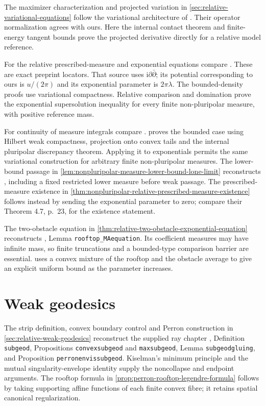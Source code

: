 The maximizer characterization and projected variation in \cref{sec:relative-variational-equations} follow the variational architecture of \cite[Theorem 4.1 and Lemma 4.2, pp.~207--209]{BBGZ13}. Their operator normalization agrees with ours. Here the internal contact theorem and finite-energy tangent bounds prove the projected derivative directly for a relative model reference.

For the relative prescribed-measure and exponential equations compare \cite[Theorem 4.3, p.~20; Theorem 5.3 and Lemma 5.4, pp.~24--25]{DDNL2020equationsv3}. These are exact preprint locators. That source uses $\mathrm{i}\partial\bar\partial$; its potential corresponding to ours is $u/(2\pi)$ and its exponential parameter is $2\pi\lambda$. The bounded-density proofs use variational compactness. Relative comparison and domination prove the exponential supersolution inequality for every finite non-pluripolar measure, with positive reference mass.

For continuity of measure integrals compare \cite[Theorem 3.10, pp.~203--205]{BBGZ13}.  proves the bounded case using Hilbert weak compactness, projection onto convex tails and the internal pluripolar discrepancy theorem. Applying it to exponentials permits the same variational construction for arbitrary finite non-pluripolar measures. The lower-bound passage in \cref{lem:nonpluripolar-measure-lower-bound-lone-limit} reconstructs \cite[Lemma 2.8, pp.~12--13]{DDNL2020equationsv3}, including a fixed restricted lower measure before weak passage. The prescribed-measure existence in \cref{thm:nonpluripolar-relative-prescribed-measure-existence} follows instead by sending the exponential parameter to zero; compare their Theorem 4.7, p.~23, for the existence statement.

The two-obstacle equation in \cref{thm:relative-two-obstacle-exponential-equation} reconstructs \cite{XiaSampleBook}, Lemma \texttt{rooftop\_MAequation}. Its coefficient measures may have infinite mass, so finite truncations and a bounded-type comparison barrier are essential.  uses a convex mixture of the rooftop and the obstacle average to give an explicit uniform bound as the parameter increases.

\section{Weak geodesics}\label{sec:history-weak-geodesics}
The strip definition, convex boundary control and Perron construction in \cref{sec:relative-weak-geodesics} reconstruct the supplied ray chapter \cite{XiaSampleBook}, Definition \texttt{subgeod}, Propositions \texttt{convexsubgeod} and \texttt{maxsubgeod}, Lemma \texttt{subgeodgluing}, and Proposition \texttt{perronenvissubgeod}. Kiselman's minimum principle and the mutual singularity-envelope identity supply the noncollapse and endpoint arguments. The rooftop formula in \cref{prop:perron-rooftop-legendre-formula} follows by taking supporting affine functions of each finite convex fibre; it retains spatial canonical regularization.

